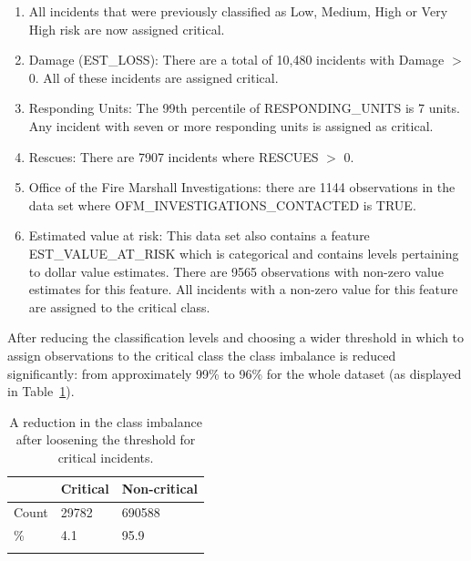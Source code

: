 \documentclass[12pt,letterpaper, oneside]
{article}
\begin{document}
\begin{enumerate}
	\item All incidents that were previously classified as Low, Medium, High or Very High risk are now assigned critical. 

	\item Damage (\textsf{EST\_LOSS}): There are a total of 10,480 incidents with Damage $>$ 0. All of these incidents are assigned critical. 

	\item Responding Units: The 99th percentile of \textsf{RESPONDING\_UNITS} is 7 units. Any incident with seven or more responding units is assigned as critical.

	\item Rescues: There are 7907 incidents where \textsf{RESCUES} $>$ 0.

	\item Office of the Fire Marshall Investigations: there are 1144 observations in the data set where \textsf{OFM\_INVESTIGATIONS\_CONTACTED} is TRUE. 

	\item Estimated value at risk: This data set also contains a feature \textsf{EST\_VALUE\_AT\_RISK} which is categorical and contains levels pertaining to dollar value estimates. There are 9565 observations with non-zero value estimates for this feature. All incidents with a non-zero value for this feature are assigned to the critical class.

\end{enumerate}

After reducing the classification levels and choosing a wider threshold in which to assign observations to the critical class the class imbalance is reduced significantly: from approximately 99\% to 96\% for the whole dataset (as displayed in Table~\ref{tab:class-imbal}). 

\begin{table}
		\begin{tabular}{l l l} \toprule
			 	& Critical & Non-critical \\ \midrule
			Count & 29782 & 690588 \\
			\% & 4.1 & 95.9 \\
			\caption{
				A reduction in the class imbalance after loosening the threshold for critical incidents.
				\label{tab:class-imbal}
			}
		\end{tabular}
\end{table}
\end{document}
